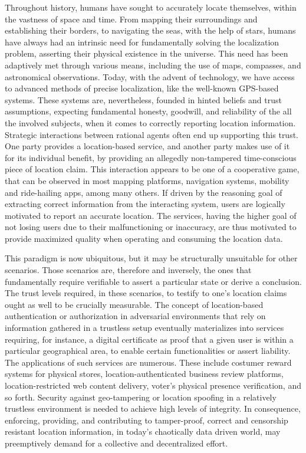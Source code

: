 

Throughout history, humans have sought to accurately locate themselves, within the vastness of space and time. From mapping their surroundings and establishing their borders, to navigating the seas, with the help of stars, humans have always had an intrinsic need for fundamentally solving the localization problem, asserting their physical existence in the universe. This need has been adaptively met through various means, including the use of maps, compasses, and astronomical observations. Today, with the advent of technology, we have access to advanced methods of precise localization, like the well-known GPS-based systems. These systems are, nevertheless, founded in hinted beliefs and trust assumptions, expecting fundamental honesty, goodwill, and reliability of the all the involved subjects, when it comes to correctly reporting location information. Strategic interactions between rational agents often end up supporting this trust. One party provides a location-based service, and another party makes use of it for its individual benefit, by providing an allegedly non-tampered time-conscious piece of location claim. This interaction appears to be one of a cooperative game, that can be observed in most mapping platforms, navigation systems, mobility and ride-hailing apps, among many others. If driven by the reasoning goal of extracting correct information from the interacting system, users are logically motivated to report an accurate location. The services, having the higher goal of not losing users due to their malfunctioning or inaccuracy, are thus motivated to provide maximized quality when operating and consuming the location data. 

This paradigm is now ubiquitous, but it may be structurally unsuitable for other scenarios. Those scenarios are, therefore and inversely, the ones that fundamentally require verifiable \pol{} to assert a particular state or derive a conclusion. The trust levels required, in these scenarios, to testify to one's location claims ought as well to be crucially measurable. The concept of location-based authentication or authorization in adversarial environments that rely on information gathered in a trustless setup eventually materializes into services requiring, for instance, a digital certificate as proof that a given user is within a particular geographical area, to enable certain functionalities or assert liability. The applications of such services are numerous. These include costumer reward systems for physical stores, location-authenticated business review platforms, location-restricted web content delivery, voter's physical presence verification, and so forth. Security against geo-tampering or location spoofing in a relatively trustless environment is needed to achieve high levels of integrity. In consequence, enforcing, providing, and contributing to tamper-proof, correct and censorship resistant location information, in today's chaotically data driven world, may preemptively demand for a collective and decentralized effort. 

